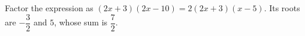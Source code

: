 Factor the expression as $(2x+3)(2x-10)=2(2x+3)(x-5)$. Its roots are $-\dfrac{3}{2}$ and $ 5 $, whose sum is $\boxed{\dfrac{7}{2}}$.
